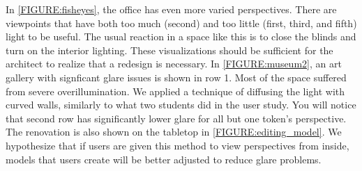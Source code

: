 \documentclass[10pt,twocolumn,letterpaper]{article}
\begin{document}



In \ref{FIGURE:fisheyes}, the office
has even more varied perspectives.  There are
viewpoints that have both too much (second) and too little (first,
third, and fifth) light to be useful.  The usual reaction in a space
like this is to close the blinds and turn on the interior lighting.
These visualizations should be sufficient for the architect to realize
that a redesign is necessary. 
In \ref{FIGURE:museum2}, an art gallery with signficant glare issues is shown in 
row 1.  Most of the space suffered from severe overillumination.  We applied 
a technique of diffusing the light with curved walls, similarly to what two
students did in the user study.  You will notice that second row has significantly lower glare 
for all but one token's perspective.  The renovation is also shown on the tabletop in \ref{FIGURE:editing_model}.
We hypothesize
that if users are given this method to view perspectives from inside, 
models that users create will be better adjusted to reduce glare problems.
\end{document}
